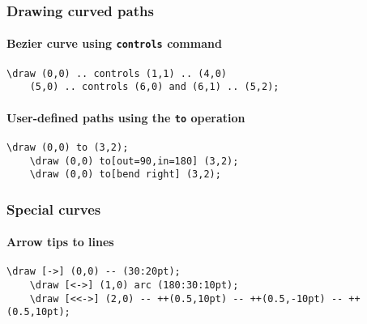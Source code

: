 \documentclass{article}
\begin{document}
\subsubsection{Drawing curved paths}
\paragraph{Bezier curve using \texttt{controls} command}
\begin{Verbatim}[fontsize=\scriptsize]
    \draw (0,0) .. controls (1,1) .. (4,0)
    (5,0) .. controls (6,0) and (6,1) .. (5,2);
\end{Verbatim}

\paragraph{User-defined paths using the \texttt{to} operation}
\begin{Verbatim}[fontsize=\scriptsize]
    \draw (0,0) to (3,2);
    \draw (0,0) to[out=90,in=180] (3,2);
    \draw (0,0) to[bend right] (3,2);
\end{Verbatim}

\subsubsection{Special curves}



\paragraph{Arrow tips to lines}
\begin{Verbatim}[fontsize=\scriptsize]
    \draw [->] (0,0) -- (30:20pt);
    \draw [<->] (1,0) arc (180:30:10pt);
    \draw [<<->] (2,0) -- ++(0.5,10pt) -- ++(0.5,-10pt) -- ++(0.5,10pt);
\end{Verbatim}
\end{document}
